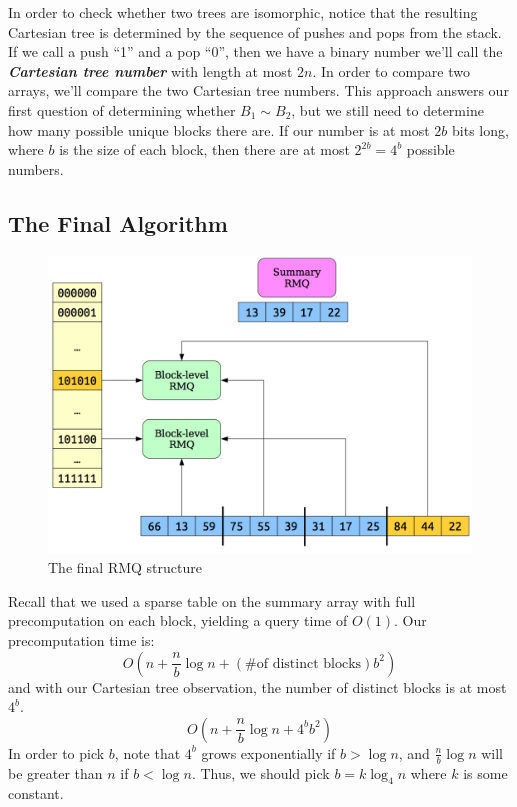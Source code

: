 \documentclass[11pt, oneside]{article}
\newcommand{\emphasis}[1]{\textbf{\textit{#1}}}
\begin{document}
In order to check whether two trees are isomorphic, notice that
the resulting Cartesian tree is determined by the sequence of pushes and pops from the stack.
If we call a push ``1'' and a pop ``0'', then we have a binary number we'll call the
\emphasis{Cartesian tree number} with length at most \( 2n \). In order to compare two arrays,
we'll compare the two Cartesian tree numbers.
This approach answers our first question of determining whether \( B_1 \sim B_2 \), but
we still need to determine how many possible unique blocks there are. If our number is at most \( 2b \) bits long,
where \( b \) is the size of each block, then there are at most \(2^{2b} = 4^b \) possible numbers.

\subsection{The Final Algorithm}

\begin{figure}[h]
\centering
\includegraphics[scale=0.25]{final}
\caption{The final RMQ structure}
\end{figure}

Recall that we used a sparse table on the summary array with full precomputation on each block,
yielding a query time of \( O(1) \). Our precomputation time is:
\[ O(n + \frac{n}{b} \log n + (\text{\# of distinct blocks}) b^2) \]
and with our Cartesian tree observation, the number of distinct blocks is at most \( 4^b \).
\[ O(n + \frac{n}{b} \log n + 4^b b^2) \]
In order to pick \( b \), note that \( 4^b \) grows exponentially if \( b > \log n \), and \( \frac{n}{b} \log n \)
will be greater than \( n \) if \( b < \log n \). Thus, we should pick \( b = k \log_4 n \) where \( k \) is some constant.
\end{document}
